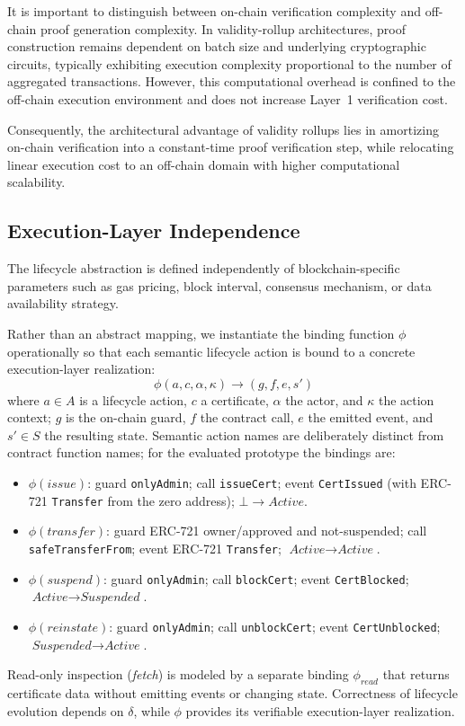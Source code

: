 \documentclass[pdflatex,sn-mathphys-num]{sn-jnl}
\begin{document}
It is important to distinguish between on-chain verification complexity and off-chain proof generation complexity. 
In validity-rollup architectures, proof construction remains dependent on batch size and underlying cryptographic circuits, typically exhibiting execution complexity proportional to the number of aggregated transactions. However, this computational overhead is confined to the off-chain execution environment and does not increase Layer~1 verification cost. 

Consequently, the architectural advantage of validity rollups lies in amortizing on-chain verification into a constant-time proof verification step, while relocating linear execution cost to an off-chain domain with higher computational scalability.



\subsection{Execution-Layer Independence}

The lifecycle abstraction is defined independently of blockchain-specific parameters such as gas pricing, block interval, consensus mechanism, or data availability strategy.

Rather than an abstract mapping, we instantiate the binding function $\phi$ operationally so that each semantic lifecycle action is bound to a concrete execution-layer realization:
\[
\phi(a, c, \alpha, \kappa) \rightarrow (g, f, e, s')
\]
where $a \in A$ is a lifecycle action, $c$ a certificate, $\alpha$ the actor, and $\kappa$ the action context; $g$ is the on-chain guard, $f$ the contract call, $e$ the emitted event, and $s' \in S$ the resulting state. Semantic action names are deliberately distinct from contract function names; for the evaluated prototype the bindings are:
\begin{itemize}
    \item $\phi(\textit{issue})$: guard \texttt{onlyAdmin}; call \texttt{issueCert}; event \texttt{CertIssued} (with ERC-721 \texttt{Transfer} from the zero address); $\bot \rightarrow \textit{Active}$.
    \item $\phi(\textit{transfer})$: guard ERC-721 owner/approved and not-suspended; call \texttt{safeTransferFrom}; event ERC-721 \texttt{Transfer}; $\textit{Active} \rightarrow \textit{Active}$.
    \item $\phi(\textit{suspend})$: guard \texttt{onlyAdmin}; call \texttt{blockCert}; event \texttt{CertBlocked}; $\textit{Active} \rightarrow \textit{Suspended}$.
    \item $\phi(\textit{reinstate})$: guard \texttt{onlyAdmin}; call \texttt{unblockCert}; event \texttt{CertUnblocked}; $\textit{Suspended} \rightarrow \textit{Active}$.
\end{itemize}
Read-only inspection (\textit{fetch}) is modeled by a separate binding $\phi_{read}$ that returns certificate data without emitting events or changing state. Correctness of lifecycle evolution depends on $\delta$, while $\phi$ provides its verifiable execution-layer realization.
\end{document}
